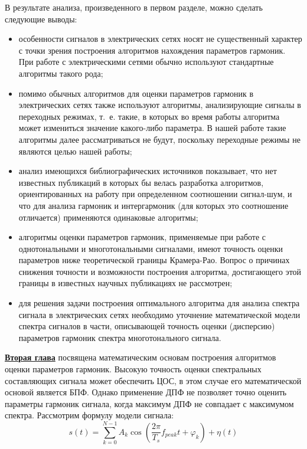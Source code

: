 В результате анализа, произведенного в первом разделе, можно сделать следующие выводы:
\begin{itemize}
\item особенности сигналов в электрических сетях носят не существенный характер с точки зрения построения алгоритмов нахождения параметров гармоник. При работе с электрическими сетями обычно используют стандартные алгоритмы такого рода; 

\item помимо обычных алгоритмов для оценки параметров гармоник в электрических сетях также используют алгоритмы, анализирующие сигналы в переходных режимах, т.~е. такие, в которых во время работы алгоритма может измениться значение какого-либо параметра. В нашей работе такие алгоритмы далее рассматриваться не будут, поскольку переходные режимы не являются целью нашей работы;

\item анализ имеющихся библиографических источников показывает, что нет известных публикаций в которых бы велась разработка алгоритмов, ориентированных на работу при определенном соотношении сигнал-шум, и что для анализа гармоник и интергармоник (для которых это соотношение отличается) применяются одинаковые алгоритмы; 

\item алгоритмы оценки параметров гармоник, применяемые при работе с однотональными и многотональными сигналами, имеют точность оценки параметров ниже теоретической границы Крамера-Рао. Вопрос о причинах снижения точности и возможности построения алгоритма, достигающего этой границы в известных научных публикациях не рассмотрен; 

\item для решения задачи построения оптимального алгоритма для анализа спектра сигнала в электрических сетях необходимо уточнение математической модели спектра сигналов в части, описывающей точность оценки (дисперсию) параметров гармоник спектра многотонального сигнала. 
\end{itemize}

\underline{\textbf{Вторая глава}} посвящена математическим основам построения алгоритмов оценки параметров гармоник.
Высокую точность оценки спектральных составляющих сигнала может
обеспечить ЦОС, в этом случае его математической
основой является БПФ. Однако применение ДПФ не позволяет точно оценить параметры гармоник сигнала, когда
максимум ДПФ не совпадает с максимумом спектра. Рассмотрим формулу модели сигнала:	
\begin{equation}
	\label{eq:equation3}
	s(t) = \displaystyle\sum_{k=0}^{N-1} A_k \cos \left({\frac{2 \pi}{T_s} f_{peak} t  + \varphi_k} \right)+ \eta(t)  
\end{equation}

